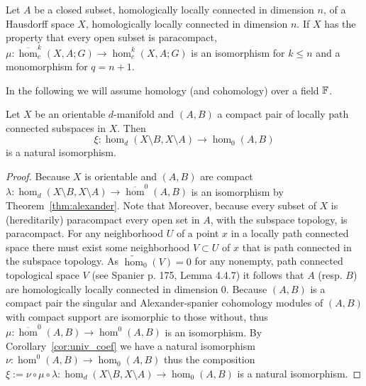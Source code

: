 \begin{lemma}\label{lem:alexander_iso}
  Let $A$ be a closed subset, homologically locally connected in dimension $n$, of a Hausdorff space $X$, homologically locally connected in dimension $n$.
  If $X$ has the property that every open subset is paracompact, $\mu : \overline{\hom}_c^k(X,A; G)\to \hom_c^k(X, A; G)$ is an isomorphism for $k\leq n$ and a monomorphism for $q = n+1$.
\end{lemma}

In the following we will assume homology (and cohomology) over a field $\mathbb{F}$.

\begin{lemma}\label{cor:alexander_iso}
  Let $X$ be an orientable $d$-manifold and $(A,B)$ a compact pair of locally path connected subspaces in $X$.
  Then
  \[\xi : \hom_d(X\setminus B, X\setminus  A)\to \hom_0(A, B)\]
  is a natural isomorphism.
\end{lemma}
\begin{proof}
  Because $X$ is orientable and $(A,B)$ are compact $\lambda : \hom_d(X\setminus B, X\setminus A)\to \overline{\hom}^{0}(A, B)$ is an isomorphism by Theorem~\ref{thm:alexander}.
  Note that
  Moreover, because every subset of $X$ is (hereditarily) paracompact every open set in $A$, with the subspace topology, is paracompact.
  For any neighborhood $U$ of a point $x$ in a locally path connected space there must exist some neighborhood $V\subset U$ of $x$ that is path connected in the subspace topology.
  As $\tilde{\hom}_0(V) = 0$ for any nonempty, path connected topological space $V$ (see Spanier p. 175, Lemma 4.4.7) it follows that $A$ (resp. $B$) are homologically locally connected in dimension $0$.
  Because $(A,B)$ is a compact pair the singular and Alexander-spanier cohomology modules of $(A,B)$ with compact support are isomorphic to those without, thus $\mu:\overline{\hom}^{0}(A, B)\to \hom^0(A, B)$ is an isomorphism.
  By Corollary~\ref{cor:univ_coef} we have a natural isomorphism $\nu : \hom^0(A, B)\to\hom_0(A, B)$ thus the composition $\xi := \nu\circ\mu\circ\lambda : \hom_d(X\setminus B, X\setminus  A)\to \hom_0(A, B)$ is a natural isomorphism.
\end{proof}


